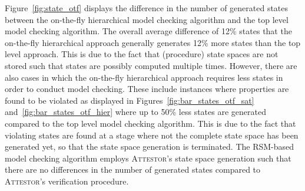 \documentclass[a4paper, 12pt, twoside]{report}
\begin{document}
	Figure~\ref{fig:state_otf} displays the difference in the number of generated states between the on-the-fly hierarchical model checking algorithm and the top level model checking algorithm. The overall average difference of 12\% states that the on-the-fly hierarchical approach generally generates 12\% more states than the top level approach. This is due to the fact that (procedure) state spaces are not stored such that states are possibly computed multiple times. However, there are also cases in which the on-the-fly hierarchical approach requires less states in order to conduct model checking. These include instances where properties are found to be violated as displayed in Figures~\ref{fig:bar_states_otf_sat} and~\ref{fig:bar_states_otf_hier} where up to 50\% less states are generated compared to the top level model checking algorithm. This is due to the fact that violating states are found at a stage where not the complete state space has been generated yet, so that the state space generation is terminated. The RSM-based model checking algorithm employs \textsc{Attestor}'s state space generation such that there are no differences in the number of generated states compared to \textsc{Attestor}'s verification procedure.\\
	
\end{document}
